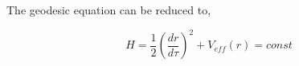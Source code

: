 \documentclass[12pt,a4paper]{article}
\begin{document}
	The geodesic equation can be reduced to,
	
	\begin{equation}
		H = \frac{1}{2} \left(\frac{d r}{d \tau}\right)^2 + V_{eff}(r) = const
	\end{equation} 
	
	

	
	
	
	
	
	
	
	
	
	
	
	
	
	
	
	
	
	
	
	
	
	
	
	

	

	
	
	
	
	
	
\end{document}
